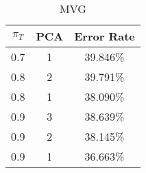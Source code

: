 \begin{center}
\begin{longtable}{|c|c|c|}
\caption{MVG}\label{tab:mvg_acctable}\\
\hline
$\pi_T$ & PCA & Error Rate\\
\hline
0.7 & 1 & 39.846\% \\
\hline
0.8 & 2 & 39.791\% \\
\hline
0.8 & 1 & 38.090\% \\
\hline
0.9 & 3 & 38.639\% \\
\hline
0.9 & 2 & 38.145\% \\
\hline
0.9 & 1 & 36.663\% \\
\hline
\hline
\end{longtable}
\end{center}
